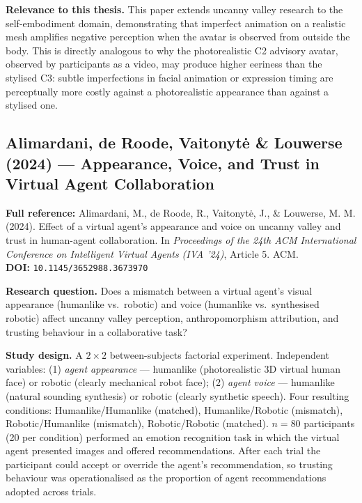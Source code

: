 \documentclass[11pt, a4paper]{article}
\begin{document}
\textbf{Relevance to this thesis.} This paper extends uncanny valley research to the self-embodiment domain, demonstrating that imperfect animation on a realistic mesh amplifies negative perception when the avatar is observed from outside the body. This is directly analogous to why the photorealistic C2 advisory avatar, observed by participants as a video, may produce higher eeriness than the stylised C3: subtle imperfections in facial animation or expression timing are perceptually more costly against a photorealistic appearance than against a stylised one.

\vspace{8pt}
\subsection{Alimardani, de Roode, Vaitonyt\.{e} \& Louwerse (2024) --- Appearance, Voice, and Trust in Virtual Agent Collaboration}

\begin{refbox}
\textbf{Full reference:} Alimardani, M., de Roode, R., Vaitonyt\.{e}, J., \& Louwerse, M. M. (2024). Effect of a virtual agent's appearance and voice on uncanny valley and trust in human-agent collaboration. In \textit{Proceedings of the 24th ACM International Conference on Intelligent Virtual Agents (IVA '24)}, Article 5. ACM.\\[4pt]
\textbf{DOI:} \texttt{10.1145/3652988.3673970}
\end{refbox}

\textbf{Research question.} Does a mismatch between a virtual agent's visual appearance (humanlike vs.\ robotic) and voice (humanlike vs.\ synthesised robotic) affect uncanny valley perception, anthropomorphism attribution, and trusting behaviour in a collaborative task?

\textbf{Study design.} A $2\times2$ between-subjects factorial experiment. Independent variables: (1) \textit{agent appearance} --- humanlike (photorealistic 3D virtual human face) or robotic (clearly mechanical robot face); (2) \textit{agent voice} --- humanlike (natural sounding synthesis) or robotic (clearly synthetic speech). Four resulting conditions: Humanlike/Humanlike (matched), Humanlike/Robotic (mismatch), Robotic/Humanlike (mismatch), Robotic/Robotic (matched). $n = 80$ participants (20 per condition) performed an emotion recognition task in which the virtual agent presented images and offered recommendations. After each trial the participant could accept or override the agent's recommendation, so trusting behaviour was operationalised as the proportion of agent recommendations adopted across trials.
\end{document}
